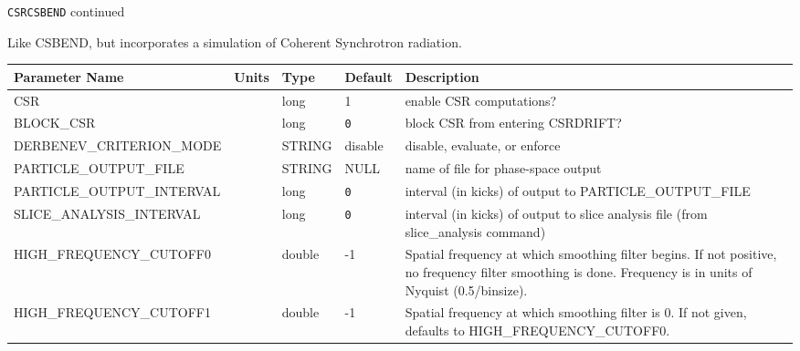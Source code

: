 \begin{latexonly}
\newpage
\begin{center}{\Large\verb|CSRCSBEND| continued}\end{center}
\end{latexonly}
Like CSBEND, but incorporates a simulation of Coherent Synchrotron radiation.
\\
\begin{tabular}{|l|l|l|l|p{\descwidth}|} \hline
Parameter Name & Units & Type & Default & Description \\ \hline 
CSR &  & long &   1               & enable CSR computations?  \\ \hline 
BLOCK\_CSR &  & long &  \verb|0| & block CSR from entering CSRDRIFT?  \\ \hline 
DERBENEV\_CRITERION\_MODE &  & STRING &   disable         & disable, evaluate, or enforce  \\ \hline 
PARTICLE\_OUTPUT\_FILE &  & STRING &   NULL            & name of file for phase-space output  \\ \hline 
PARTICLE\_OUTPUT\_INTERVAL &  & long &  \verb|0| & interval (in kicks) of output to PARTICLE\_OUTPUT\_FILE  \\ \hline 
SLICE\_ANALYSIS\_INTERVAL &  & long &  \verb|0| & interval (in kicks) of output to slice analysis file (from slice\_analysis command)  \\ \hline 
HIGH\_FREQUENCY\_CUTOFF0 &  & double &   -1 & Spatial frequency at which smoothing filter begins.  If not positive, no frequency filter smoothing is done.  Frequency is in units of Nyquist (0.5/binsize).  \\ \hline 
HIGH\_FREQUENCY\_CUTOFF1 &  & double &   -1 & Spatial frequency at which smoothing filter is 0.  If not given, defaults to HIGH\_FREQUENCY\_CUTOFF0.  \\ \hline 
\end{tabular}

